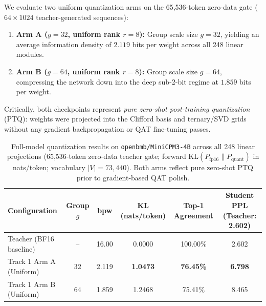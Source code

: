 \documentclass{article}
\begin{document}
We evaluate two uniform quantization arms on the 65,536-token zero-data gate ($64 \times 1024$ teacher-generated sequences):
\begin{enumerate}[leftmargin=*]
\item \textbf{Arm A ($g=32$, uniform rank $r=8$):} Group scale size $g=32$, yielding an average information density of $\mathbf{2.119}$ bits per weight across all 248 linear modules.
\item \textbf{Arm B ($g=64$, uniform rank $r=8$):} Group scale size $g=64$, compressing the network down into the deep sub-2-bit regime at $\mathbf{1.859}$ bits per weight.
\end{enumerate}
Critically, both checkpoints represent \emph{pure zero-shot post-training quantization} (PTQ): weights were projected into the Clifford basis and ternary/SVD grids without any gradient backpropagation or QAT fine-tuning passes.

\begin{table}[t]
\centering\small
\caption{Full-model quantization results on \texttt{openbmb/MiniCPM3-4B} across all 248 linear projections (65,536-token zero-data teacher gate; forward $\mathrm{KL}(P_{\mathrm{fp16}}\|P_{\mathrm{quant}})$ in nats/token; vocabulary $|V|=73{,}440$). Both arms reflect pure zero-shot PTQ prior to gradient-based QAT polish.}
\label{tab:minicpm3}
\begin{tabular}{lccccc}
\toprule
Configuration & Group $g$ & bpw & KL (nats/token) & Top-1 Agreement & Student PPL (Teacher: 2.602) \\
\midrule
Teacher (BF16 baseline) & -- & 16.00 & 0.0000 & 100.00\% & 2.602 \\
Track 1 Arm A (Uniform) & 32 & 2.119 & \textbf{1.0473} & \textbf{76.45\%} & \textbf{6.798} \\
Track 1 Arm B (Uniform) & 64 & 1.859 & 1.2468 & 75.41\% & 8.465 \\
\bottomrule
\end{tabular}
\end{table}
\end{document}
